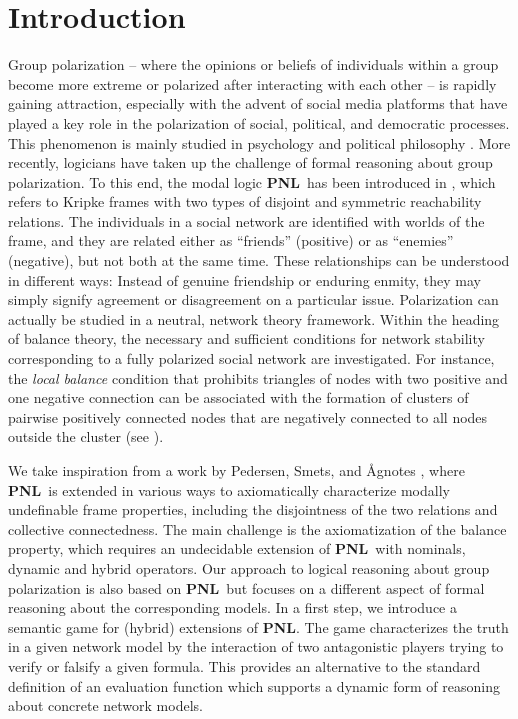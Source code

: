 \documentclass{easychair}
\newcommand{\PNL}{\textbf{PNL}}
\begin{document}
\section{Introduction}\label{sec:intro} Group polarization -- where the
opinions or beliefs of individuals within a group become more extreme or
polarized after interacting with each other -- is rapidly gaining attraction,
especially with the advent of social media platforms that have played a key role
in the polarization of social, political, and democratic processes. This
phenomenon is mainly studied in psychology
\cite{myers1976group,isenberg1986group} and political philosophy
\cite{sunstein1999law,sunstein2007group}. More recently, logicians have taken
up the challenge of formal reasoning about group polarization. To this
end, the modal logic \PNL~has been introduced in
\cite{DBLP:journals/jolli/XiongA20}, which refers to Kripke frames with two
types of disjoint and symmetric reachability relations. The individuals in a
social network are identified with worlds of the frame, and they
are related either as ``friends'' (positive) or as ``enemies''
(negative), but not both at the same time. These relationships can
be understood in different ways: Instead of genuine friendship or enduring
enmity, they may simply signify agreement or disagreement on a particular
issue. Polarization can actually be studied in a neutral, network
theory framework. Within the heading of balance theory, the necessary and
sufficient conditions for network stability corresponding to a fully polarized
social network are investigated. For instance, the \emph{local balance} condition that prohibits triangles
of nodes with two positive and one negative connection can be associated with
the formation of clusters of pairwise positively connected nodes that are
negatively connected to all nodes outside the cluster (see ). 

We take inspiration from a work by Pedersen, Smets, and {\AA}gnotes
\cite{DBLP:journals/logcom/PedersenSA21}, where \PNL~is extended in
various ways to axiomatically characterize modally undefinable frame
properties, including the disjointness of the two relations and collective
connectedness. The main challenge is the axiomatization of the balance
property, which requires an undecidable extension of \PNL~with nominals,
 dynamic and hybrid operators. Our approach to logical reasoning about group
polarization is also based on \PNL~but focuses on a different aspect
of formal reasoning about the corresponding models. In a first step, we introduce a
semantic game for (hybrid) extensions of \PNL.  The game characterizes
the truth in a given network model by the interaction of two antagonistic
players trying to verify or falsify a given formula. This provides an
alternative to the standard definition of an evaluation function which supports
a dynamic form of reasoning about concrete network models.
\end{document}
